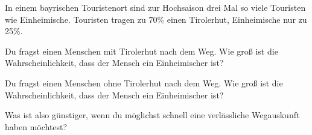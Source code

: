 \documentclass[%
11pt,%
twoside,%
titlepage,%
german,%
headsepline%
]{scrartcl}
\begin{document}

\begin{ueb}
In einem bayrischen Touristenort sind zur Hochsaison drei Mal so viele Touristen wie Einheimische. Touristen tragen zu 70\% einen Tirolerhut, Einheimische nur zu 25\%.
\begin{enumeratea}
\item Du fragst einen Menschen mit Tirolerhut nach dem Weg. Wie groß ist die Wahrscheinlichkeit, dass der
Mensch ein Einheimischer ist?
\item Du fragst einen Menschen ohne Tirolerhut nach dem Weg. Wie groß ist die Wahrscheinlichkeit, dass
der Mensch ein Einheimischer ist?
\end{enumeratea}
Was ist also günstiger, wenn du möglichst schnell eine verlässliche Wegauskunft haben möchtest?
\end{ueb}


\end{document}
